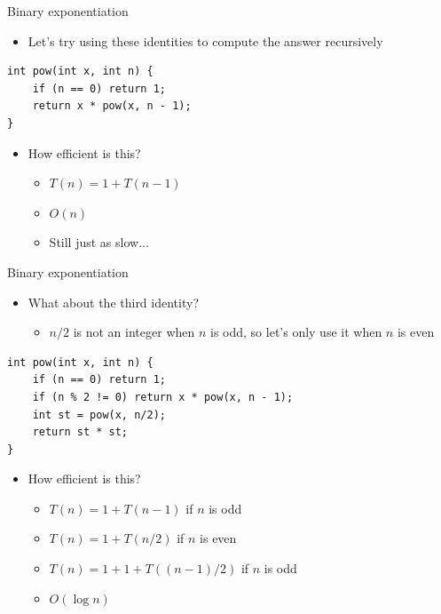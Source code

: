 \documentclass{beamer}
\begin{document}
\begin{frame}{Binary exponentiation}
    \begin{itemize}
        \item Let's try using these identities to compute the answer recursively
    \end{itemize}

    \vspace{10pt}

    \begin{verbatim}
int pow(int x, int n) {
    if (n == 0) return 1;
    return x * pow(x, n - 1);
}
    \end{verbatim}

    \vspace{10pt}

    \begin{itemize}
        \item<2-> How efficient is this?
            \begin{itemize}
                \item $T(n) = 1 + T(n-1)$
                \item<3-> $O(n)$
                \item<4-> Still just as slow...
            \end{itemize}
    \end{itemize}

\end{frame}

\begin{frame}{Binary exponentiation}
    \begin{itemize}
        \item What about the third identity?
            \begin{itemize}
                \item $n/2$ is not an integer when $n$ is odd, so let's only use it when $n$ is even
            \end{itemize}
    \end{itemize}

    \begin{verbatim}
int pow(int x, int n) {
    if (n == 0) return 1;
    if (n % 2 != 0) return x * pow(x, n - 1);
    int st = pow(x, n/2);
    return st * st;
}
    \end{verbatim}

    \begin{itemize}
        \item How efficient is this?
            \begin{itemize}
                \item<2-> $T(n) = 1 + T(n-1)$ if $n$ is odd
                \item<2-> $T(n) = 1 + T(n/2)$ if $n$ is even
                \item<3-> $T(n) = 1 + 1 + T((n-1)/2)$ if $n$ is odd
                \item<4-> $O(\log n)$
            \end{itemize}
    \end{itemize}
\end{frame}
\end{document}
